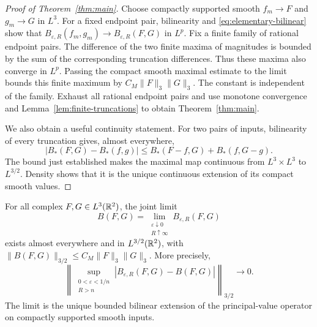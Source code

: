 \begin{proof}[Proof of Theorem~\ref{thm:main}]
Choose compactly supported smooth $f_m\to F$ and $g_m\to G$ in $L^3$.
For a fixed endpoint pair, bilinearity and
\eqref{eq:elementary-bilinear} show that
$B_{\varepsilon,R}(f_m,g_m)\to B_{\varepsilon,R}(F,G)$ in $L^p$.
Fix a finite family of rational endpoint pairs.  The difference of the
two finite maxima of magnitudes is bounded by the sum of the corresponding
truncation differences.  Thus these maxima also converge in $L^p$.
Passing the compact smooth maximal estimate to the limit bounds this
finite maximum by $C_M\|F\|_3\|G\|_3$.  The constant is independent of
the family.  Exhaust all rational endpoint pairs and use monotone
convergence and Lemma~\ref{lem:finite-truncations} to obtain
Theorem~\ref{thm:main}.

We also obtain a useful continuity statement.  For two pairs of inputs,
bilinearity of every truncation gives, almost everywhere,
\begin{equation}\label{eq:maximal-continuity}
 |B_*(F,G)-B_*(f,g)|
 \le B_*(F-f,G)+B_*(f,G-g).
\end{equation}
The bound just established makes the maximal map continuous from
$L^3\times L^3$ to $L^{3/2}$.  Density shows that it is the unique
continuous extension of its compact smooth values.
\end{proof}

\begin{theorem}\label{thm:bilinear-pv}
For all complex $F,G\in L^3(\mathbb R^2)$, the joint limit
\[
 B(F,G)=\lim_{\substack{\varepsilon\downarrow0\\R\uparrow\infty}}
            B_{\varepsilon,R}(F,G)
\]
exists almost everywhere and in $L^{3/2}(\mathbb R^2)$, with
$\|B(F,G)\|_{3/2}\le C_M\|F\|_3\|G\|_3$.
More precisely,
\begin{equation}\label{eq:maximal-tail-convergence}
 \left\|\sup_{\substack{0<\varepsilon<1/n\\R>n}}
 |B_{\varepsilon,R}(F,G)-B(F,G)|\right\|_{3/2}
 \longrightarrow0.
\end{equation}
The limit is the unique bounded bilinear extension of the
principal-value operator on compactly supported smooth inputs.
\end{theorem}

